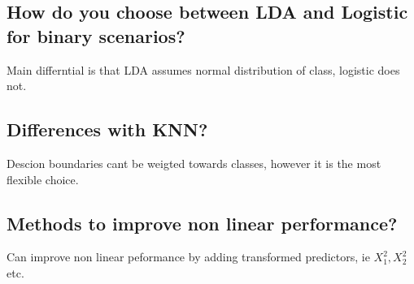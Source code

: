 \documentclass[11pt]{scrartcl} %
\begin{document}
\subsection{How do you choose between LDA and Logistic for binary scenarios?}

Main differntial is that LDA assumes normal distribution of class, logistic does not.

\subsection{Differences with KNN?}

Descion boundaries cant be weigted towards classes, however it is the most flexible choice.

\subsection{Methods to improve non linear performance?}

Can improve non linear peformance by adding transformed predictors, ie \(X_1^2,X_2^2\) etc.





\end{document}
